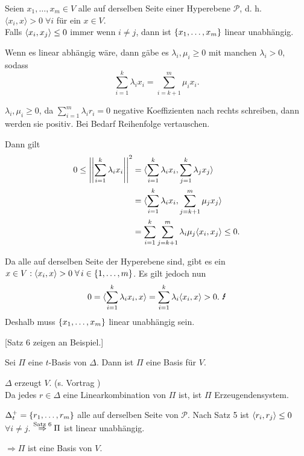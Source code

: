 \documentclass[12pt]{extarticle}
\begin{document}
\begin{satz} %
    Seien \( x_1, \ldots, x_m \in V \) alle auf derselben 
    Seite einer Hyperebene \( \mathscr{P} \), 
    d. h. \( \langle x_i, x \rangle > 0 \;\forall i \) für 
    ein \( x\in V \). \\
    Falls \( \langle x_i, x_j \rangle \leq 0 \) immer wenn 
    \( i \neq j \), dann ist \( \{x_1, \ldots, x_m\} \) 
    linear unabhängig.
\end{satz}

\begin{bew}
    Wenn es linear abhängig wäre, dann gäbe es 
    \( \lambda_i, \mu_i \geq 0 \) mit 
    manchen \( \lambda_i > 0 \), sodass 
    \[ \sum_{i=1}^k \lambda_i x_i 
    = \sum_{i=k+1}^m \mu_i x_i. \]
    
    \( \lambda_i, \mu_i \geq 0 \), da 
    \( \sum_{i=1}^m \lambda_i r_i = 0 \) 
    negative Koeffizienten nach rechts schreiben, 
    dann werden sie positiv. Bei Bedarf 
    Reihenfolge vertauschen.

    Dann gilt 
    \begin{align*}
        0 \leq \norm{\sum_{i=1}^k \lambda_i x_i}^2 
        &= \scalarprod{\sum_{i=1}^{k} \lambda_{i} x_{i}}{
        \sum_{j=1}^{k} \lambda_{j} x_{j}} \\
        &= \scalarprod{\sum_{i=1}^{k} \lambda_{i} x_{i}}{
        \sum_{j=k+1}^{m} \mu_{j} x_{j}} \\
        &= \sum_{i=1}^{k} \sum_{j=k+1}^{m} \lambda_{i} \mu_{j}
        \scalarprod{x_i}{x_j} 
        \leq 0. %
    \end{align*}

    Da alle auf derselben Seite der Hyperebene sind, 
    gibt es ein \( x \in V: \scalarprod{x_i}{x} > 0 
    \;\forall i \in \set{1,\ldots, m} \).
    Es gilt jedoch nun 
    \[ 0 = \scalarprod{\sum_{i=1}^{k} \lambda_i x_i}{x} 
    = \sum_{i=1}^k \lambda_i \scalarprod{x_i}{x} > 0. \text{ \Lightning{}} \]
    Deshalb muss \( \{x_1, \ldots, x_m\} \) linear 
    unabhängig sein.
\end{bew}
{\Large{}[Satz 6 zeigen an Beispiel.]}

\begin{satz} %
    Sei \( \Pi \) eine \(t\)-Basis von \( \Delta \). Dann ist 
    \( \Pi \) eine Basis für \( V \).
\end{satz}
\begin{bew}
    \( \Delta \) erzeugt \( V \). (s. Vortrag )\\
    Da jedes \( r \in \Delta \) eine Linearkombination von \( \Pi \) ist, 
    ist \( \Pi \) Erzeugendensystem.

    \( \Delta_t^+ = \{r_1, \ldots, r_m\} \) alle auf derselben Seite 
    von \( \mathscr{P} \). Nach Satz 5 ist \( \langle r_i, r_j \rangle \leq 0 \)
    \( \forall i \neq j \). \( \overset{\text{Satz 6}}{\Rightarrow} \Pi \) 
    ist linear unabhängig.

    \( \Rightarrow \Pi \) ist eine Basis von \(V\).
\end{bew}
\end{document}
